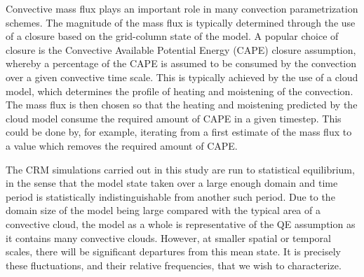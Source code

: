 \documentclass[11pt,a4paper]{article}
\newcommand\todo[1]{\textbf{TODO: #1}}
\begin{document}

Convective mass flux plays an important role in many convection parametrization schemes. The magnitude of the mass flux is typically determined through the use of a closure based on the grid-column state of the model. A popular choice of closure is the Convective Available Potential Energy (CAPE) closure assumption, whereby a percentage of the CAPE is assumed to be consumed by the convection over a given convective time scale. 
This is typically achieved by the use of a cloud model, which determines the profile of heating and moistening of the convection. The mass flux is then chosen so that the heating and moistening predicted by the cloud model consume the required amount of CAPE in a given timestep. This could be done by, for example, iterating from a first estimate of the mass flux to a value which removes the required amount of CAPE.

The CRM simulations carried out in this study are run to statistical equilibrium, in the sense that the model state taken over a large enough domain and time period is statistically indistinguishable from another such period. Due to the domain size of the model being large compared with the typical area of a convective cloud, the model as a whole is representative of the QE assumption as it contains many convective clouds. However, at smaller spatial or temporal scales, there will be significant departures from this mean state. It is precisely these fluctuations, and their relative frequencies, that we wish to characterize.
\end{document}
